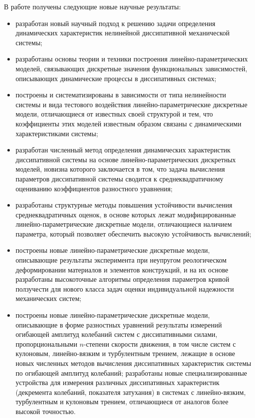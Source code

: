 {В работе получены следующие новые научные результаты:
\begin{itemize}
\item[--] 
разработан новый научный подход к решению задачи определения динамических характеристик нелинейной диссипативной механической системы;
\item[--] разработаны основы теории и техники построения линейно-параметрических моделей, связывающих дискретные значения функциональных зависимостей, описывающих динамические процессы в диссипативных системах;
\item[--] построены и систематизированы в зависимости от типа нелинейности системы и вида тестового воздействия линейно-параметрические дискретные модели, отличающиеся от известных своей структурой и тем, что коэффициенты этих моделей известным образом связаны с динамическими характеристиками системы;
\item[--] разработан численный метод определения динамических характеристик диссипативной системы на основе линейно-параметрических дискретных моделей, новизна которого заключается в том, что задача вычисления параметров диссипативной системы сводится к среднеквадратичному оцениванию коэффициентов разностного уравнения;
\item[--] разработаны структурные методы повышения устойчивости вычисления среднеквадратичных оценок, в основе которых лежат модифицированные линейно-параметрические дискретные модели, отличающиеся наличием параметра, который позволяет обеспечить высокую устойчивость вычислений;
\item[--] построены новые линейно-параметрические дискретные модели, описывающие результаты эксперимента при неупругом реологическом деформировании материалов и элементов конструкций, и на их основе разработаны высокоточные алгоритмы определения параметров кривой ползучести для нового класса задач оценки индивидуальной надежности механических систем;
\item[--] построены новые линейно-параметрические дискретные модели, описывающие в форме разностных уравнений результаты измерений огибающей амплитуд колебаний систем с диссипативными силами, пропорциональными $n$-степени скорости движения, в том числе систем с кулоновым, линейно-вязким и турбулентным трением, лежащие в основе новых численных методов вычисления диссипативных характеристик системы по огибающей амплитуд колебаний;
разработаны новые специализированные устройства для измерения различных диссипативных характеристик (декремента колебаний, показателя затухания) в системах с линейно-вязким, турбулентным и кулоновым трением, отличающиеся от аналогов более высокой точностью.
\end{itemize}

}
